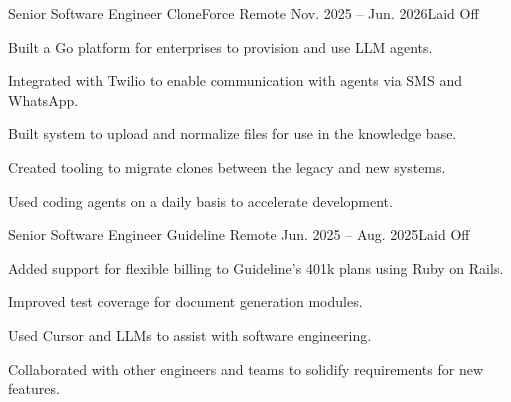 

\begin{cventries}

  \cventry
    {Senior Software Engineer} %
    {CloneForce} %
    {Remote} %
    {Nov. 2025 – Jun. 2026\newline Laid Off} %
    {
      \begin{cvitems} %
        \item {Built a Go platform for enterprises to provision and use LLM agents.}
        \item {Integrated with Twilio to enable communication with agents via SMS and WhatsApp.}
        \item {Built system to upload and normalize files for use in the knowledge base.}
        \item {Created tooling to migrate clones between the legacy and new systems.}
        \item {Used coding agents on a daily basis to accelerate development.}
      \end{cvitems}
    }

  \cventry
    {Senior Software Engineer} %
    {Guideline} %
    {Remote} %
    {Jun. 2025 – Aug. 2025\newline Laid Off} %
    {
      \begin{cvitems} %
        \item {Added support for flexible billing to Guideline's 401k plans using Ruby on Rails.}
        \item {Improved test coverage for document generation modules.}
        \item {Used Cursor and LLMs to assist with software engineering.}
        \item {Collaborated with other engineers and teams to solidify requirements for new features.}
      \end{cvitems}
    }


\end{cventries}
